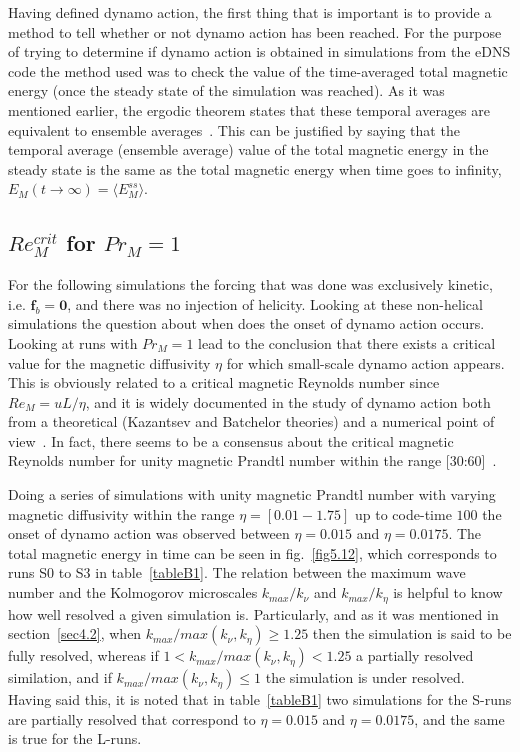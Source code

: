 \documentclass[12pt,a4paper]{report}
\begin{document}
Having defined dynamo action, the first thing that is important is to provide a method to tell whether or not dynamo action has been reached. For the purpose of trying to determine if dynamo action is obtained in simulations from the eDNS code the method used was to check the value of the time-averaged total magnetic energy (once the steady state of the simulation was reached). As it was mentioned earlier, the ergodic theorem states that these temporal averages are equivalent to ensemble averages~\cite{biskamp1997nonlinear}. This can be justified by saying that the temporal average (ensemble average) value of the total magnetic energy in the steady state is the same as the total magnetic energy when time goes to infinity, $E_M(t\rightarrow\infty)=\langle E_M^{ss} \rangle$.

\subsection{$Re_M^{crit}$ for $Pr_M=1$}

For the following simulations the forcing that was done was exclusively kinetic, i.e. $\bm f_b = \bm 0$, and there was no injection of helicity. Looking at these non-helical simulations the question about when does the onset of dynamo action occurs. Looking at runs with $Pr_M = 1$ lead to the conclusion that there exists a critical value for the magnetic diffusivity $\eta$ for which small-scale dynamo action appears. This is obviously related to a critical magnetic Reynolds number since $Re_M=uL/\eta$, and it is widely documented in the study of dynamo action both from a theoretical (Kazantsev and Batchelor theories) and a numerical point of view~\cite{kazantsev1968enhancement, schekochihin2004critical, haugen2004simulations, batchelor1950spontaneous, schekochihin2007fluctuation, tobias2011mhd}. In fact, there seems to be a consensus about the critical magnetic Reynolds number for unity magnetic Prandtl number within the range [30:60]~\cite{brandenburg2005astrophysical, kazantsev1968enhancement}.

Doing a series of simulations with unity magnetic Prandtl number with varying magnetic diffusivity within the range $\eta=[0.01-1.75]$ up to code-time $100$ the onset of dynamo action was observed between $\eta=0.015$ and $\eta=0.0175$. The total magnetic energy in time can be seen in fig.~\ref{fig5.12}, which corresponds to runs S0 to S3 in table~\ref{tableB1}. The relation between the maximum wave number and the Kolmogorov microscales $k_{max}/k_\nu$ and $k_{max}/k_\eta$ is helpful to know how well resolved a given simulation is. Particularly, and as it was mentioned in section~\ref{sec4.2}, when $k_{max}/max(k_\nu, k_\eta) \geq 1.25$ then the simulation is said to be fully resolved, whereas if $1 < k_{max}/max(k_\nu, k_\eta) < 1.25$ a partially resolved similation, and if $k_{max}/max(k_\nu, k_\eta) \leq 1$ the simulation is under resolved. Having said this, it is noted that in table~\ref{tableB1} two simulations for the S-runs are partially resolved that correspond to $\eta=0.015$ and $\eta=0.0175$, and the same is true for the L-runs. 
\end{document}
